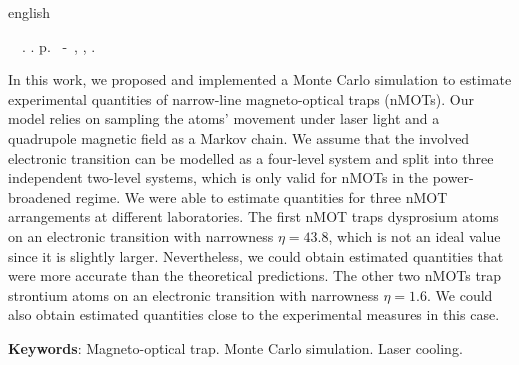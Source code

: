 \begin{resumo}[ABSTRACT]
 \begin{otherlanguage*}{english}
	\begin{flushleft} 
		\setlength{\absparsep}{0pt} %
 		\SingleSpacing  		\imprimirautorabr~~\textbf{\imprimirtitleabstract}.	\imprimirdata.  \pageref{LastPage}p. 
		\imprimirtipotrabalhoabs~-~\imprimirinstituicao, \imprimirlocal, 	\imprimirdata. 
 	\end{flushleft}
	\OnehalfSpacing 
   In this work, we proposed and implemented a Monte Carlo simulation to estimate experimental quantities of narrow-line magneto-optical traps (nMOTs). Our model relies on sampling the atoms' movement under laser light and a quadrupole magnetic field as a Markov chain. We assume that the involved electronic transition can be modelled as a four-level system and split into three independent two-level systems, which is only valid for nMOTs in the power-broadened regime. We were able to estimate quantities for three nMOT arrangements at different laboratories. The first nMOT traps dysprosium atoms on an electronic transition with narrowness $ \eta = 43.8 $, which is not an ideal value since it is slightly larger. Nevertheless, we could obtain estimated quantities that were more accurate than the theoretical predictions. The other two nMOTs trap strontium atoms on an electronic transition with narrowness $ \eta = 1.6 $. We could also obtain estimated quantities close to the experimental measures in this case.

   \vspace{\onelineskip}
 
   \noindent 
   \textbf{Keywords}: Magneto-optical trap. Monte Carlo simulation. Laser cooling.
 \end{otherlanguage*}
\end{resumo}
